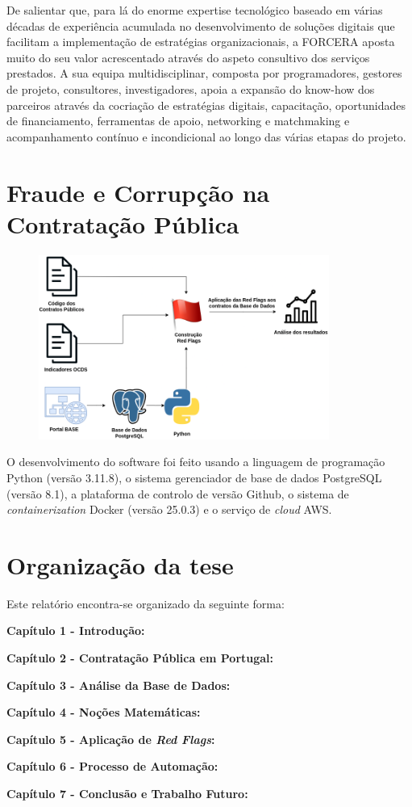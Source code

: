 De salientar que, para lá do enorme expertise tecnológico baseado em várias décadas de experiência acumulada no desenvolvimento de soluções digitais que facilitam a implementação de estratégias organizacionais, a FORCERA aposta muito do seu valor acrescentado através do aspeto consultivo dos serviços prestados. A sua equipa multidisciplinar, composta por programadores, gestores de projeto, consultores, investigadores, apoia a expansão do know-how dos parceiros através da cocriação de estratégias digitais, capacitação, oportunidades de financiamento, ferramentas de apoio, networking e matchmaking e acompanhamento contínuo e incondicional ao longo das várias etapas do projeto.



\section{Fraude e Corrupção na Contratação Pública}


\begin{figure}[H]
	\centering
	\includegraphics[width=0.85\textwidth]{imagens/processo_tese.png}
	\caption{}
	\label{}
\end{figure}

O desenvolvimento do software foi feito usando a linguagem de programação Python (versão 3.11.8), o sistema gerenciador de base de dados PostgreSQL (versão 8.1), a plataforma de controlo de versão Github, o sistema de \textit{containerization} Docker (versão 25.0.3) e o serviço de \textit{cloud} AWS. 




\section{Organização da tese}

Este relatório encontra-se organizado da seguinte forma: 

\textbf{Capítulo 1 - Introdução:}

\textbf{Capítulo 2 - Contratação Pública em Portugal:}

\textbf{Capítulo 3 - Análise da Base de Dados:}

\textbf{Capítulo 4 - Noções Matemáticas:}

\textbf{Capítulo 5 - Aplicação de \textit{Red Flags}:}

\textbf{Capítulo 6 - Processo de Automação:}

\textbf{Capítulo 7 - Conclusão e Trabalho Futuro:}

